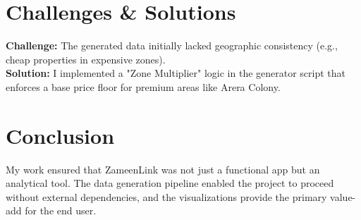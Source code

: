 \documentclass[12pt, a4paper]{article}
\begin{document}
\section{Challenges \& Solutions}
\textbf{Challenge:} The generated data initially lacked geographic consistency (e.g., cheap properties in expensive zones).\\
\textbf{Solution:} I implemented a "Zone Multiplier" logic in the generator script that enforces a base price floor for premium areas like Arera Colony.

\section{Conclusion}
My work ensured that ZameenLink was not just a functional app but an analytical tool. The data generation pipeline enabled the project to proceed without external dependencies, and the visualizations provide the primary value-add for the end user.
\end{document}

